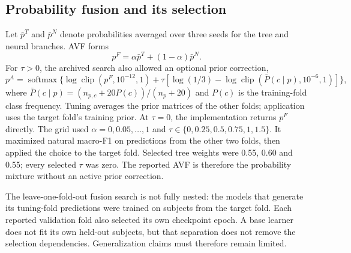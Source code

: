 \subsection{Probability fusion and its selection}
Let $\bar p^{T}$ and $\bar p^{N}$ denote probabilities averaged over three seeds for the tree and neural branches. AVF forms
\begin{equation}
p^{F}=\alpha\bar p^{T}+(1-\alpha)\bar p^{N}.
\end{equation}
For $\tau>0$, the archived search also allowed an optional prior correction,
\begin{equation}
p^{A}=\operatorname{softmax}\{\log\operatorname{clip}(p^{F},10^{-12},1)
+\tau[\log(1/3)-\log\operatorname{clip}(\bar P(c\mid p),10^{-6},1)]\},
\end{equation}
where $\bar P(c\mid p)=(n_{p,c}+20P(c))/(n_p+20)$ and $P(c)$ is the training-fold class frequency. Tuning averages the prior matrices of the other folds; application uses the target fold's training prior. At $\tau=0$, the implementation returns $p^F$ directly. The grid used $\alpha=0,0.05,\ldots,1$ and $\tau\in\{0,0.25,0.5,0.75,1,1.5\}$. It maximized natural macro-F1 on predictions from the other two folds, then applied the choice to the target fold. Selected tree weights were 0.55, 0.60 and 0.55; every selected $\tau$ was zero. The reported AVF is therefore the probability mixture without an active prior correction.

The leave-one-fold-out fusion search is not fully nested: the models that generate its tuning-fold predictions were trained on subjects from the target fold. Each reported validation fold also selected its own checkpoint epoch. A base learner does not fit its own held-out subjects, but that separation does not remove the selection dependencies. Generalization claims must therefore remain limited.
